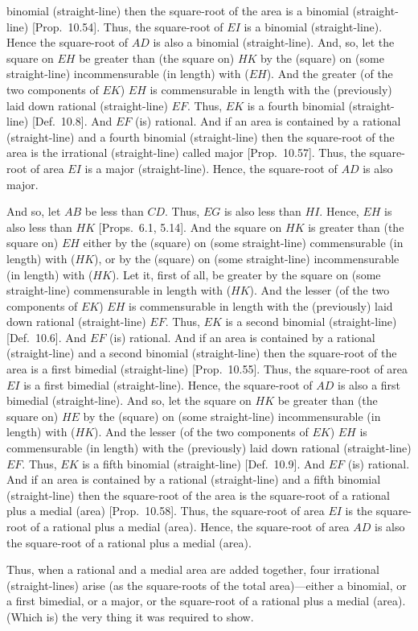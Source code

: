 \begin{Parallel}{}{}
{binomial (straight-line) then the square-root  of the  area is a binomial
(straight-line)  [Prop.~10.54]. Thus,
the square-root of $EI$ is a binomial (straight-line). Hence the square-root of $AD$ is also a binomial (straight-line).  And, so, let the
 square on $EH$ be greater than (the square on) $HK$ by the (square) on 
 (some straight-line) incommensurable (in length) with ($EH$). And the
 greater (of the two components of $EK$) $EH$ is commensurable in length with the (previously)
 laid down rational (straight-line) $EF$. Thus, $EK$ is a fourth
 binomial (straight-line) [Def.~10.8]. And
 $EF$ (is) rational. And if an area
 is contained by a rational (straight-line) and a fourth binomial (straight-line) 
 then the square-root of the area is the irrational (straight-line) called
 major [Prop.~10.57]. Thus, the square-root
 of area $EI$ is a major (straight-line). Hence, the square-root of
 $AD$ is also major.

 And so, let $AB$ be less than $CD$. Thus, $EG$ is also less
 than $HI$. Hence, $EH$ is also less than $HK$ [Props.~6.1, 5.14].
 And the square on $HK$ is greater than (the square on) $EH$ either
 by the (square) on (some straight-line) commensurable (in length)
 with ($HK$), or by the (square) on (some straight-line) incommensurable
 (in length) with ($HK$). Let it, first of all, be greater by the square
 on (some straight-line) commensurable in length with ($HK$).
 And the lesser (of the two components of $EK$) $EH$ is  commensurable in length with the
 (previously) laid down rational (straight-line) $EF$. Thus, $EK$
 is a second binomial (straight-line) [Def.~10.6]. 
 And $EF$ (is) rational. And if an area is contained by a rational (straight-line)
 and a second binomial (straight-line)  then the square-root of the area is a
 first bimedial (straight-line) [Prop.~10.55]. 
 Thus, the square-root of area $EI$ is a first bimedial (straight-line).
 Hence, the square-root of $AD$ is also a first bimedial (straight-line).
 And so, let the square on $HK$ be greater than (the square on) $HE$
 by the (square) on (some straight-line) incommensurable (in length) with
 ($HK$). 
 And the lesser (of the two components of $EK$) $EH$ is commensurable (in length) with the (previously) laid down rational (straight-line) $EF$.  Thus, $EK$ is a fifth binomial
 (straight-line) [Def.~10.9]. And $EF$ (is) rational. And if an area is
 contained by a rational (straight-line) and a fifth binomial (straight-line) 
 then the square-root of the area is the square-root of a rational plus
 a medial (area) [Prop.~10.58]. Thus, the square-root of area $EI$ is the square-root of a rational plus a medial (area). Hence,
 the square-root of area $AD$ is also the square-root of a rational plus
 a medial (area).
 
\centerline{}

 Thus, when a rational and a medial area are added together, four irrational
(straight-lines) arise (as the square-roots of the
total area)---either a binomial, or a first bimedial, or a major, or the
square-root of a rational plus a medial (area). (Which is) the very thing
it was required to show.}
\end{Parallel}

